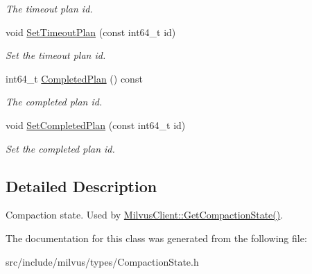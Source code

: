 \begin{DoxyCompactItemize}
\begin{DoxyCompactList}\small\item\em The timeout plan id. \end{DoxyCompactList}\item 
\mbox{\label{classmilvus_1_1_compaction_state_a3e5fbb0b20db4df6c8737d692f31ad90}} 
void \hyperlink{classmilvus_1_1_compaction_state_a3e5fbb0b20db4df6c8737d692f31ad90}{Set\+Timeout\+Plan} (const int64\+\_\+t id)
\begin{DoxyCompactList}\small\item\em Set the timeout plan id. \end{DoxyCompactList}\item 
\mbox{\label{classmilvus_1_1_compaction_state_a6ca8b8639ba81f1cc601f7853c3a5c5c}} 
int64\+\_\+t \hyperlink{classmilvus_1_1_compaction_state_a6ca8b8639ba81f1cc601f7853c3a5c5c}{Completed\+Plan} () const
\begin{DoxyCompactList}\small\item\em The completed plan id. \end{DoxyCompactList}\item 
\mbox{\label{classmilvus_1_1_compaction_state_aa1966f995626ba8c8f3e7e7c86f403f5}} 
void \hyperlink{classmilvus_1_1_compaction_state_aa1966f995626ba8c8f3e7e7c86f403f5}{Set\+Completed\+Plan} (const int64\+\_\+t id)
\begin{DoxyCompactList}\small\item\em Set the completed plan id. \end{DoxyCompactList}\end{DoxyCompactItemize}


\subsection{Detailed Description}
Compaction state. Used by \hyperlink{classmilvus_1_1_milvus_client_a8041cd363470774d2cdb3c295307e1d9}{Milvus\+Client\+::\+Get\+Compaction\+State()}. 

The documentation for this class was generated from the following file\+:\begin{DoxyCompactItemize}
\item 
src/include/milvus/types/Compaction\+State.\+h\end{DoxyCompactItemize}
